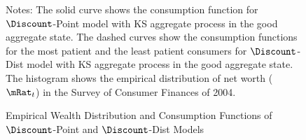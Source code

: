 \begin{figure}
\caption{Empirical Wealth Distribution and Consumption Functions of
$\Discount$-Point and $\Discount$-Dist Models}
\label{CFuncDistSevenPointPermAndHistNetWorthPlotFedQuarterly}
\footnotesize Notes: The solid curve shows the consumption function
for $\Discount$-Point model with KS aggregate process in the good
aggregate state.  The dashed curves show the consumption functions
for the most patient and the least patient consumers for
$\Discount$-Dist model with KS aggregate process in the good
aggregate state. The histogram shows the empirical distribution of
net worth ($\mRat_{t}$) in the Survey of Consumer Finances of 2004.
\end{figure}
